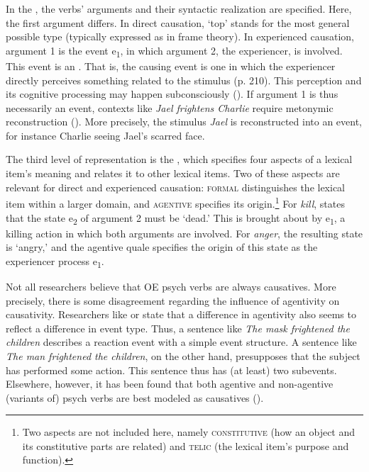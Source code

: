 In the , the verbs' arguments and their syntactic realization are specified. Here, the first argument differs. In direct causation, `top' stands for the most general possible type (typically expressed as {} in frame theory). In experienced causation, argument 1 is the event e\textsubscript{1}, in which argument 2, the experiencer, is involved. This event is an . That is, the causing event is one in which the experiencer directly perceives something related to the stimulus (p. 210). This perception and its cognitive processing may happen subconsciously (\citealt[197]{Geuder.2000}).
If argument 1 is thus necessarily an event, contexts like \textit{Jael frightens Charlie} require metonymic reconstruction (\citealt[209]{Pustejovsky.1995}). More precisely, the stimulus \textit{Jael} is reconstructed into an event, for instance Charlie seeing Jael's scarred face. 

The third level of representation is the , which specifies four aspects of a lexical item's meaning and relates it to other lexical items. Two of these aspects are relevant for direct and experienced causation: \textsc{formal} distinguishes the lexical item within a larger domain, and \textsc{agentive} specifies its origin.\footnote{Two aspects are not included here, namely \textsc{constitutive} (how an object and its constitutive parts are related) and \textsc{telic} (the lexical item's purpose and function).} For \textit{kill}, \citet{Pustejovsky.1995} states that the state e\textsubscript{2} of argument 2 must be `dead.' This is brought about by e\textsubscript{1}, a killing action in which both arguments are involved. For \textit{anger}, the resulting state is `angry,' and the agentive quale specifies the origin of this state as the experiencer process e\textsubscript{1}. 

Not all researchers believe that OE psych verbs are always causatives. More precisely, there is some disagreement regarding the influence of agentivity on causativity. Researchers like \citet[11--12]{DiDesidero.1993} or \citet{Kailuweit.2005} state that a difference in agentivity also seems to reflect a difference in event type. Thus, a sentence like \textit{The mask frightened the children} describes a reaction event with a simple event structure. A sentence like \textit{The man frightened the children}, on the other hand, presupposes that the subject has performed some action. This sentence thus has (at least) two subevents. Elsewhere, however, it has been found that both agentive and non-agentive (variants of) psych verbs are best modeled as causatives (\citealt[71]{Martin.2013}).  


